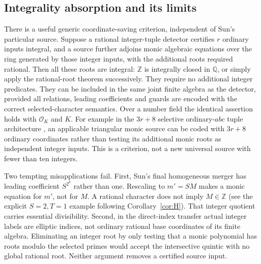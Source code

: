 \documentclass[11pt]{article}
\newcommand{\Q}{\mathbb Q}\newcommand{\Z}{\mathbb Z}\newcommand{\N}{\mathbb N}
\newcommand{\OK}{\mathcal O_K}\newcommand{\vp}{v_p}\newcommand{\Sp}{\operatorname{Spec}}
\begin{document}
\subsection{Integrality absorption and its limits}
There is a useful generic coordinate-saving criterion, independent of
Sun's particular source. Suppose a rational integer-tuple detector
certifies $r$ ordinary inputs integral, and a source further adjoins
monic algebraic equations over the ring generated by those integer
inputs, with the additional roots required rational. Then all these
roots are integral: $\Z$ is integrally closed in $\Q$, or simply apply
the rational-root theorem successively. They require no additional
integer predicates. They can be included in the same joint finite
algebra as the detector, provided all relations, leading coefficients
and guards are encoded with the correct selected-character semantics.
Over a number field the identical assertion holds with $\OK$ and $K$.
For example in the $3r+8$ selective ordinary-$abc$ tuple architecture
\cite{selective}, an applicable triangular monic source can be coded
with $3r+8$ ordinary coordinates rather than testing its additional
monic roots as independent integer inputs. This is a criterion, not
a new universal source with fewer than ten integers.

Two tempting misapplications fail. First, Sun's final homogeneous
merger has leading coefficient $S^{2^k}$ rather than one. Rescaling to
$m'=S M$ makes a monic equation for $m'$, not for $M$. A rational
character does not imply $M\in\Z$ (see the explicit $S=2,T=1$
example following Corollary~\ref{cor:H}). That integer quotient carries
essential divisibility. Second, in the direct-index transfer actual
integer labels are elliptic indices, not ordinary rational base
coordinates of its finite algebra. Eliminating an integer root by
only testing that a monic polynomial has roots modulo the selected
primes would accept the intersective quintic with no global rational
root. Neither argument removes a certified source input.
\end{document}
